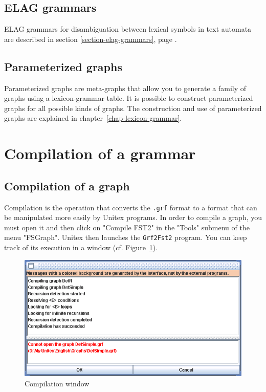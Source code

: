 \subsection{ELAG grammars}

ELAG grammars for disambiguation between lexical symbols in text automata are
described in section \ref{section-elag-grammars}, page
\pageref{section-elag-grammars}.


\subsection{Parameterized graphs}
Parameterized graphs are meta-graphs that allow you to generate a family of graphs
using a lexicon-grammar table. It is possible to construct parameterized
graphs for all possible kinds of graphs. The construction and use of parameterized
graphs are explained in chapter~\ref{chap-lexicon-grammar}.

\section{Compilation of a grammar}
\label{section-graph-compilation}
\subsection{Compilation of a graph}
Compilation is the operation that converts the \verb+.grf+ format
to a format that can be manipulated more easily  by Unitex programs. In order to
compile a graph, you must open it and then click on "Compile FST2" in the
"Tools" submenu of the menu "FSGraph". Unitex then launches the 
\verb+Grf2Fst2+ program. You can keep track of its execution in a 
window (cf. Figure~\ref{fig-compilation-frame}).

\bigskip
\begin{figure}[!h]
\begin{center}
\includegraphics[width=14.7cm]{resources/img/fig6-4.png}
\caption{Compilation window\label{fig-compilation-frame}}
\end{center}
\end{figure}

